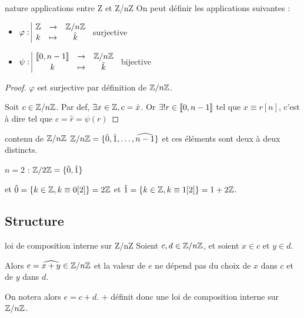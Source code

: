 \begin{theorement}{nature applications entre Z et Z/nZ}{}
    On peut définir les applications suivantes : 
    \begin{itemize}
        \item $\varphi: \space \begin{array}{|ccc} \displaystyle \mathbb{Z} & \to & \displaystyle \mathbb{Z}/n\mathbb{Z} \\ \displaystyle k & \mapsto & \displaystyle \hat k \end{array}$ surjective
        \item \avspace $\psi: \space \begin{array}{|ccc} \displaystyle [\![0, n-1]\!] & \to & \displaystyle \mathbb{Z}/n\mathbb{Z} \\ \displaystyle k & \mapsto & \displaystyle \hat k \end{array}$ bijective
    \end{itemize}
\end{theorement}


\begin{proof}
    $\varphi$ est surjective par définition de $\mathbb{Z}/n\mathbb{Z}$.

    Soit $c \in \mathbb{Z}/n\mathbb{Z}$. Par def, $\exists x \in \mathbb{Z}, c = \hat x$. Or $\exists ! r \in [\![0, n-1]\!]$ 
    tel que $x \equiv r [n]$, c'est à dire tel que $c = \hat r = \psi(r)$
\end{proof}

\begin{corollaire}{contenu de $\mathbb{Z}/n\mathbb{Z}$}{}
    $\mathbb{Z}/n\mathbb{Z} = \{\hat 0, \hat 1, \ldots, \widehat{n-1}\}$ et ces éléments sont 
    deux à deux distincts.
\end{corollaire}

\begin{exemple}
    $n = 2$ : $\mathbb{Z}/2\mathbb{Z} = \{\hat 0, \hat 1\}$

    et $\hat 0 = \{k \in \mathbb{Z}, k \equiv 0 [2]\} = 2 \mathbb{Z}$ et $\hat 1 = \{k \in \mathbb{Z}, k \equiv 1 [2]\} = 1 + 2 \mathbb{Z}$.
\end{exemple}

\subsection{Structure }

\begin{proposition}{loi de composition interne sur Z/nZ}{}
    Soient $c, d \in \mathbb{Z}/n\mathbb{Z}$, et soient $x \in c$ et $y \in d$. 

    Alors $e = \widehat{x + y} \in \mathbb{Z}/n \mathbb{Z}$ et la valeur de $e$ ne dépend pas du choix de $x$
    dans $c$ et de $y$ dans $d$.

    On notera alors $e = c + d$.
    $+$ définit donc une loi de composition interne sur $\mathbb{Z}/n\mathbb{Z}$.
\end{proposition}


